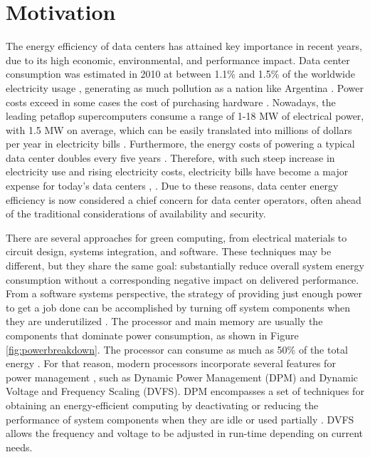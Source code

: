 
\section{Motivation}
The energy efficiency of data centers has attained key importance in recent years, due to its high economic, environmental, and performance impact. 
Data center consumption was estimated in 2010 at between 1.1\% and 1.5\% of the worldwide electricity usage \cite{Dayarathna2016DataSurvey,Corcoran2017EmergingICT}, generating as much pollution as a nation like Argentina  \cite{Mathew2012Energy-awareNetworks}.
Power costs exceed in some cases the cost of purchasing hardware \cite{Rivoire2007ModelsOptimizations}. 
Nowadays, the leading petaflop supercomputers consume a range of 1-18 MW of electrical power, with 1.5 MW on average, which can be easily translated into millions of dollars per year in electricity bills \cite{Group2012HandbookSahni}.
Furthermore, the energy costs of powering a typical data center doubles every five years \cite{Buyya2013MasteringProgramming}.
Therefore, with such steep increase in electricity use and rising electricity costs, electricity bills have become a major expense for today's data centers \cite{Poess2008EnergyResults}, \cite{Gao2013QualityCenters}. 
Due to these reasons, data center energy efficiency is now considered a chief concern for data center operators, often ahead of the traditional considerations of availability and security.

There are several approaches for green computing, from electrical materials to circuit design, systems integration, and software. These techniques may be different, but they share the same goal: substantially reduce overall system energy consumption without a corresponding negative impact on delivered performance. 
From a software systems perspective, the strategy of providing just enough power to get a job done can be accomplished by turning off system components when they are underutilized \cite{Mathew2012Energy-awareNetworks}.
The processor and main memory are usually the components that dominate power consumption, as shown in Figure  \ref{fig:powerbreakdown}.
The processor can consume as much as 50\% of the total energy \cite{Fan2007, Barroso2007TheComputing, Malladi2012TowardsDRAM}. For that reason, modern processors incorporate several features for power management \cite{Rotem2012Power-managementBridge, Brown2005, Hackenberg2015}, such as Dynamic Power Management (DPM) and Dynamic Voltage and Frequency Scaling (DVFS). 
DPM encompasses a set of techniques for obtaining an energy-efficient computing by deactivating or reducing the performance of system components when they are idle or used partially \cite{Shuja2012Energy-efficientCenters, Benini2000AManagement}.
DVFS allows the frequency and voltage to be adjusted in run-time depending on current needs.

